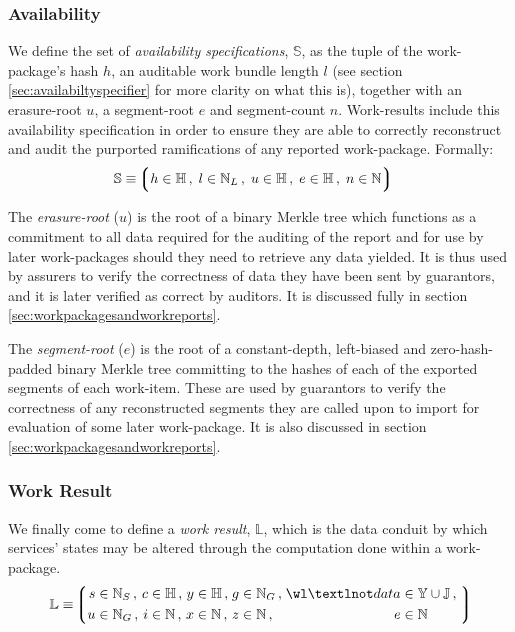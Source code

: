 \subsubsection{Availability}
We define the set of \emph{availability specifications}, $\mathbb{S}$, as the tuple of the work-package's hash $h$, an auditable work bundle length $l$ (see section \ref{sec:availabiltyspecifier} for more clarity on what this is), together with an erasure-root $u$, a segment-root $e$ and segment-count $n$. Work-results include this availability specification in order to ensure they are able to correctly reconstruct and audit the purported ramifications of any reported work-package. Formally:
\begin{align}
  \mathbb{S} &\equiv \tuple{
    \isa{h}{\H}\,,\;
    \isa{l}{\N_L}\,,\;
    \isa{u}{\H}\,,\;
    \isa{e}{\H}\,,\;
    \isa{n}{\N}
  }
\end{align}

The \emph{erasure-root} ($u$) is the root of a binary Merkle tree which functions as a commitment to all data required for the auditing of the report and for use by later work-packages should they need to retrieve any data yielded. It is thus used by assurers to verify the correctness of data they have been sent by guarantors, and it is later verified as correct by auditors. It is discussed fully in section \ref{sec:workpackagesandworkreports}.

The \emph{segment-root} ($e$) is the root of a constant-depth, left-biased and zero-hash-padded binary Merkle tree committing to the hashes of each of the exported segments of each work-item. These are used by guarantors to verify the correctness of any reconstructed segments they are called upon to import for evaluation of some later work-package. It is also discussed in section \ref{sec:workpackagesandworkreports}.

\subsubsection{Work Result}
We finally come to define a \emph{work result}, $\mathbb{L}$, which is the data conduit by which services' states may be altered through the computation done within a work-package.
\begin{equation}\label{eq:workresult}
  \mathbb{L} \equiv \tuple{
    \begin{alignedat}{9}
      \isa{s&}{\N_S}\,,\;
      \isa{&c&}{\H}\,,\;
      \isa{&y&}{\H}\,,\;
      \isa{&g&}{\N_G}\,,\;
      \isa{&\wl¬data&}{\Y \cup \mathbb{J}}\,,\;\\
      \isa{u&}{\N_G}\,,\; %
      \isa{&i&}{\N}\,,\; %
      \isa{&x&}{\N}\,,\; %
      \isa{&z&}{\N}\,,\; %
      \isa{&e&}{\N} %
    \end{alignedat}
  }
\end{equation}

